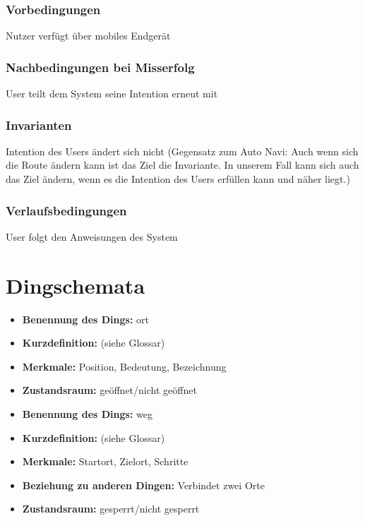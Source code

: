 \subsubsection*{Vorbedingungen} 
Nutzer verfügt über mobiles Endgerät 
\subsubsection*{Nachbedingungen bei Misserfolg} 
User teilt dem System seine Intention erneut mit 
\subsubsection*{Invarianten} 
Intention des Users ändert sich nicht (Gegensatz zum Auto Navi: Auch wenn sich die Route ändern kann ist das Ziel die Invariante. In unserem Fall kann sich auch das Ziel ändern, wenn es die Intention des Users erfüllen kann und näher liegt.) 
\subsubsection*{Verlaufsbedingungen} 
User folgt den Anweisungen des System 

\section{Dingschemata}

\begin{itemize}
\item \textbf{Benennung des Dings:} \Gls{ort}
\item \textbf{Kurzdefinition:} (siehe Glossar)
\item \textbf{Merkmale:} Position, Bedeutung, Bezeichnung
\item \textbf{Zustandsraum:} geöffnet/nicht geöffnet
\end{itemize}

\hrulefill

\begin{itemize}
\item \textbf{Benennung des Dings:} \Gls{weg}
\item \textbf{Kurzdefinition:} (siehe Glossar)
\item \textbf{Merkmale:} Startort, Zielort, Schritte
\item \textbf{Beziehung zu anderen Dingen:} Verbindet zwei Orte
\item \textbf{Zustandsraum:} gesperrt/nicht gesperrt
\end{itemize}

